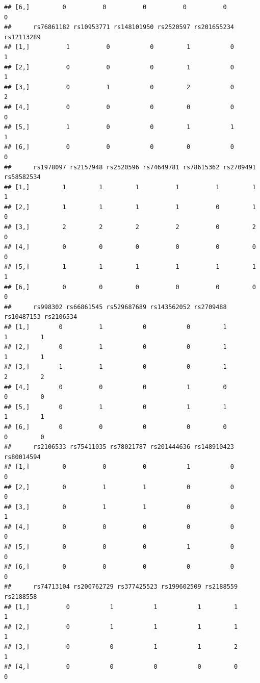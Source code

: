 \documentclass[
]{article}
\begin{document}
\begin{verbatim}
## [6,]         0          0          0          0          0          0
##      rs76861182 rs10953771 rs148101950 rs2520597 rs201655234 rs12113289
## [1,]          1          0           0         1           0          1
## [2,]          0          0           0         1           0          1
## [3,]          0          1           0         2           0          2
## [4,]          0          0           0         0           0          0
## [5,]          1          0           0         1           1          1
## [6,]          0          0           0         0           0          0
##      rs1978097 rs2157948 rs2520596 rs74649781 rs78615362 rs2709491 rs58582534
## [1,]         1         1         1          1          1         1          1
## [2,]         1         1         1          1          0         1          0
## [3,]         2         2         2          2          0         2          0
## [4,]         0         0         0          0          0         0          0
## [5,]         1         1         1          1          1         1          1
## [6,]         0         0         0          0          0         0          0
##      rs998302 rs66861545 rs529687689 rs143562052 rs2709488 rs10487153 rs2106534
## [1,]        0          1           0           0         1          1         1
## [2,]        0          1           0           0         1          1         1
## [3,]        1          1           0           0         1          2         2
## [4,]        0          0           0           1         0          0         0
## [5,]        0          1           0           1         1          1         1
## [6,]        0          0           0           0         0          0         0
##      rs2106533 rs75411035 rs78021787 rs201444636 rs148910423 rs80014594
## [1,]         0          0          0           1           0          0
## [2,]         0          1          1           0           0          0
## [3,]         0          1          1           0           0          1
## [4,]         0          0          0           0           0          0
## [5,]         0          0          0           1           0          0
## [6,]         0          0          0           0           0          0
##      rs74713104 rs200762729 rs377425523 rs199602509 rs2188559 rs2188558
## [1,]          0           1           1           1         1         1
## [2,]          0           1           1           1         1         1
## [3,]          0           0           1           1         2         1
## [4,]          0           0           0           0         0         0

\end{verbatim}
\end{document}
